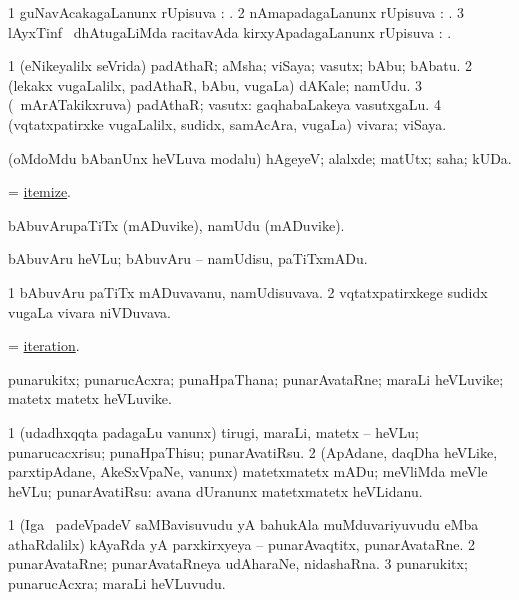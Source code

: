\bentry
{}
\gl{\uparx}
\bmng
\bnum
\num{1} guNavAcakagaLanunx rUpisuva \uparx: . 
\num{2} nAmapadagaLanunx rUpisuva \uparx: . 
\num{3} lAyxTinf \BUkaq\ dhAtugaLiMda racitavAda kirxyApadagaLanunx rUpisuva \uparx: . 
\enum
\emng
\eentry

\bentry
{}
\gl{\nA}
\bmng
\bnum
\num{1} (eNikeyalilx seVrida) padAthaR; aMsha; viSaya; vasutx; bAbu; bAbatu. 
\num{2} (lekakx \mo vugaLalilx, padAthaR, bAbu, \mo vugaLa) dAKale; namUdu. 
\num{3} (\kanmu\ mArATakikxruva) padAthaR; vasutx:  gaqhabaLakeya vasutxgaLu. 
\num{4} (vqtatxpatirxke \mo vugaLalilx, sudidx, samAcAra, \mo vugaLa) vivara; viSaya. 
\enum
\emng
\eentry

\bentry
{}
\gl{\kirxvi}
\bmng
(oMdoMdu bAbanUnx heVLuva modalu) hAgeyeV; alalxde; matUtx; saha; kUDa. 
\emng
\eentry

\bentry
{}
\gl{\sakirx}
\bmng
=  \hyperlink{itemize}{itemize}. 
\emng
\eentry

\bentry
{}
\gl{\nA}
\bmng
bAbuvArupaTiTx (mADuvike), namUdu (mADuvike). 
\emng
\eentry

\bentry
{}
\gl{\sakirx}
\bmng
bAbuvAru heVLu; bAbuvAru -- namUdisu, paTiTxmADu. 
\emng
\eentry

\bentry
{}
\gl{\nA}
\bmng
\bnum
\num{1} bAbuvAru paTiTx mADuvavanu, namUdisuvava. 
\num{2} vqtatxpatirxkege sudidx \mo vugaLa vivara niVDuvava. 
\enum
\emng
\eentry

\bentry
{}
\gl{\nA}
\bmng
=  \hyperlink{iteration}{iteration}. 
\emng
\eentry

\bentry
{}
\gl{\nA}
\bmng
punarukitx; punarucAcxra; punaHpaThana; punarAvataRne; maraLi heVLuvike; matetx matetx heVLuvike. 
\emng
\eentry

\bentry
{}
\gl{\sakirx}
\bmng
\bnum
\num{1} (udadhxqqta padagaLu \mo vanunx) tirugi, maraLi, matetx -- heVLu; punarucacxrisu; punaHpaThisu; punarAvatiRsu. 
\num{2} (ApAdane, daqDha heVLike, parxtipAdane, AkeSxVpaNe, \mo vanunx) matetxmatetx mADu; meVliMda meVle heVLu; punarAvatiRsu:  avana dUranunx matetxmatetx heVLidanu. 
\enum
\emng
\eentry

\bentry
{}
\gl{\nA}
\bmng
\bnum
\num{1} (Iga \sA\ padeVpadeV saMBavisuvudu yA bahukAla muMduvariyuvudu eMba athaRdalilx) kAyaRda yA parxkirxyeya -- punarAvaqtitx, punarAvataRne. 
\num{2} punarAvataRne; punarAvataRneya udAharaNe, nidashaRna. 
\num{3} punarukitx; punarucAcxra; maraLi heVLuvudu. 
\enum
\emng
\eentry

